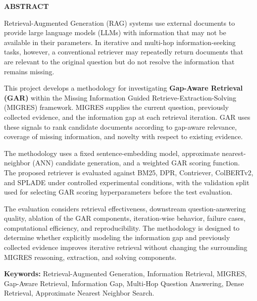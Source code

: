 \documentclass[12pt,a4paper]{report}
\newcommand{\fronttitle}[1]{
    \begin{center}
        {\fontsize{18}{21}\selectfont\bfseries #1\par}
    \end{center}
    \vspace{0.12in}
}
\begin{document}

\setcounter{page}{1}


\fronttitle{ABSTRACT}

\justifying

Retrieval-Augmented Generation (RAG) systems use external documents to provide large language models (LLMs) with information that may not be available in their parameters. In iterative and multi-hop information-seeking tasks, however, a conventional retriever may repeatedly return documents that are relevant to the original question but do not resolve the information that remains missing.

This project develops a methodology for investigating \textbf{Gap-Aware Retrieval (GAR)} within the Missing Information Guided Retrieve-Extraction-Solving (MIGRES) framework. MIGRES supplies the current question, previously collected evidence, and the information gap at each retrieval iteration. GAR uses these signals to rank candidate documents according to gap-aware relevance, coverage of missing information, and novelty with respect to existing evidence.

The methodology uses a fixed sentence-embedding model, approximate nearest-neighbor (ANN) candidate generation, and a weighted GAR scoring function. The proposed retriever is evaluated against BM25, DPR, Contriever, ColBERTv2, and SPLADE under controlled experimental conditions, with the validation split used for selecting GAR scoring hyperparameters before the test evaluation.

The evaluation considers retrieval effectiveness, downstream question-answering quality, ablation of the GAR components, iteration-wise behavior, failure cases, computational efficiency, and reproducibility. The methodology is designed to determine whether explicitly modeling the information gap and previously collected evidence improves iterative retrieval without changing the surrounding MIGRES reasoning, extraction, and solving components.

\vspace{0.10in}

\textbf{Keywords:}
Retrieval-Augmented Generation, Information Retrieval, MIGRES, Gap-Aware Retrieval, Information Gap, Multi-Hop Question Answering, Dense Retrieval, Approximate Nearest Neighbor Search.
\clearpage
\end{document}
